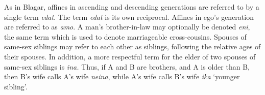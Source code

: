 As in Blagar, affines in ascending and descending generations are referred to by a single term \textit{edat}. The term \textit{edat} is its own reciprocal. Affines in ego's generation are referred to as \textit{amo}. A man's brother-in-law may optionally be denoted \textit{eni}, the same term which is used to denote marriageable cross-cousins. Spouses of same-sex siblings may refer to each other as siblings, following the relative ages of their spouses. In addition, a more respectful term for the elder of two spouses of same-sex siblings is \textit{ina.} Thus, if A and B are brothers, and A is older than B, then B's wife calls A's wife \textit{neina}, while A's wife calls B's wife \textit{ika} `younger sibling'. 

 


\begin{table}\centering




\end{table}
